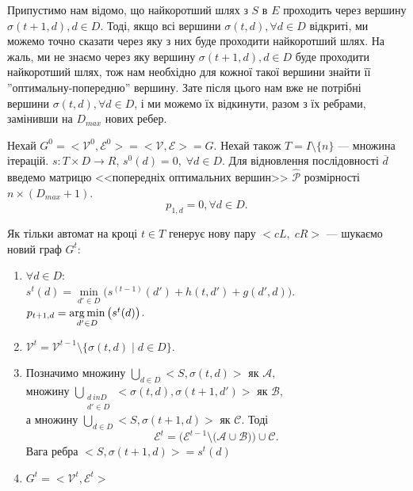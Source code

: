 Припустимо нам відомо, що найкоротший шлях з $S$ в $E$ проходить через вершину $ \sigma(t+1, d), d \in D $. 
Тоді, якщо всі вершини $ \sigma(t, d), \forall d \in D $ відкриті, ми можемо точно сказати через яку з них буде проходити найкоротший шлях. На жаль, ми не знаємо через яку вершину $ \sigma(t+1, d), d \in D $ буде проходити найкоротший шлях, тож нам необхідно для кожної такої вершини знайти її ''оптимальну-попередню'' вершину. Зате після цього нам вже не потрібні вершини $ \sigma(t, d), \forall d \in D $, і ми можемо їх відкинути, разом з їх ребрами, замінивши на $D_{max}$ нових ребер.

Нехай $G^0 = <\mathcal{V}^0, \mathcal{E}^0> = <\mathcal{V}, \mathcal{E}> = G $. Нехай також $ T = I \setminus \{ n \} $ --- множина ітерацій. 
$ s: T \times D \rightarrow R $, $s^0(d) = 0, \; \forall d \in D $. Для відновлення послідовності 
$\overline{d}$ введемо матрицю <<попередніх оптимальних вершин>> $\hat{\mathcal{P}}$ розмірності $n \times (D_{max} + 1)$.  $$p_{1,d} = 0, \forall d \in D. $$

Як тільки автомат на кроці $ t \in T $ генерує нову пару $<cL, \;cR>$ --- шукаємо новий граф $G^t$:
\begin{enumerate}
	\item 
		$\forall d \in D :$\\
		$s^t(d) = \min\limits_{d' \in D} \big( s^{(t-1)}(d') + h(t, d') + g(d', d) \big).$\\
		$p_{t+1,d} = \operatorname*{arg\,min}\limits_{d' \in D}{\big( s^t(d) \big) }$.
	\item 
		$\mathcal{V}^t = \mathcal{V}^{t-1} \setminus \{ \sigma(t, d) \; | \; d \in D \}.$
	\item %
		Позначимо множину $ \bigcup\limits_{d \in D} <S, \sigma(t, d) > $ як $ \mathcal{A},$ \\
		множину $ \bigcup\limits_{\substack{d \ in D \\ d' \in D}} <\sigma(t, d), \sigma(t+1, d') > $ як $ \mathcal{B},$ \\
		а множину $ \bigcup\limits_{d \in D} <S, \sigma(t+1, d) > $ як $ \mathcal{C}. $ Тоді 
		$$\mathcal{E}^t = \Big( \mathcal{E}^{t-1} \setminus \big( \mathcal{A} \cup \mathcal{B} \big) \Big) \cup \mathcal{C}.$$
		Вага ребра $ <S, \sigma(t+1, d) > = s^t(d)$ %
	\item 
		$G^t = <\mathcal{V}^t, \mathcal{E}^t> $ \\
\end{enumerate}

